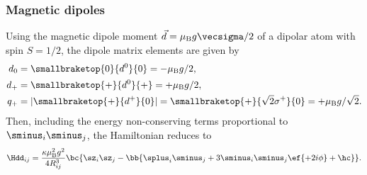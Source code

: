 \subsubsection{Magnetic dipoles}
Using the magnetic dipole moment $\vec{d}=\mu_\text{B} g \vecsigma / 2$ of a dipolar atom with spin $S=1/2$,
the dipole matrix elements are given by
\begin{align}
    d_0 &= \smallbraketop{0}{d^0}{0} = -\mu_\text{B}g/2, \vphantom{\sqrt{2}} \\
    d_+ &= \smallbraketop{+}{d^0}{+} = +\mu_\text{B}g/2, \vphantom{\sqrt{2}} \\
    q_+ &= |\smallbraketop{+}{d^+}{0}| = \smallbraketop{+}{\sqrt{2} \sigma^+}{0} = +\mu_\text{B}g/\sqrt{2}.
\end{align}
Then, including the energy non-conserving terms proportional to $\sminus_i\sminus_j$, the Hamiltonian reduces to
\begin{align}
    \Hdd_{ij} = \frac{\kappa \mu_\text{B}^2 g^2}{4 R_{ij}^3} \bc{ \sz_i \sz_j - \bb{\splus_i \sminus_j+ 3 \sminus_i\sminus_j \ef{+2i\phi} + \hc } }.
\end{align}

